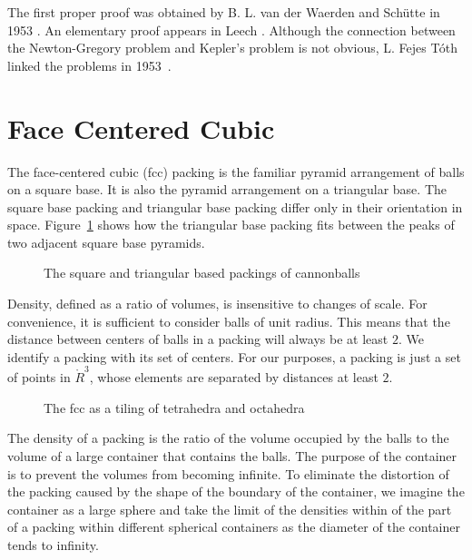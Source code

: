 The first proper proof was obtained by B. L. van der Waerden and
Sch\"utte in 1953 \cite{Sch53}.  An elementary proof appears in Leech
\cite{Lee56}.  Although the connection between the Newton-Gregory
problem and Kepler's problem is not obvious, L. Fejes T\'oth linked the
problems in 1953~\cite{Fej53}.


\section{Face Centered Cubic}



The face-centered cubic (fcc) packing is the familiar pyramid arrangement of
balls on a square base.  It is also the pyramid arrangement on a
triangular base.  The square base packing and triangular base packing
differ only in their orientation in space.
Figure~\ref{fig:tri-square-cannonballs} shows how the triangular base
packing fits between the peaks of two adjacent square base pyramids.

\begin{figure}[htb]
  \centering
  \caption{The square and triangular based packings of cannonballs}
  \label{fig:tri-square-cannonballs}
\end{figure}

Density, defined as a ratio of volumes, is insensitive to changes of
scale.  For convenience, it is sufficient to consider balls of unit
radius. This means that the distance between centers of balls in a
packing will always be at least $2$.  We identify a packing with its set
of centers.   For our purposes, a packing is just a set of points
in $\ring{R}^3$, whose elements are separated by distances at least
$2$.


\begin{figure}[htb]
  \centering
  \caption{The fcc as a tiling of tetrahedra and octahedra}
  \label{fig:tet-oct}
\end{figure}

The density of a packing is the ratio of the volume occupied by the
balls to the volume of a large container that contains the balls.  The
purpose of the container is to prevent the volumes from becoming
infinite.  To eliminate the distortion of the packing caused by the
shape of the boundary of the container, we imagine the container as a
large sphere and take the limit of the densities within of the part of
a packing within different spherical containers as the diameter of the
container tends to infinity.

